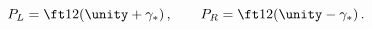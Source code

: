 \begin{equation}
  P_L=\ft12(\unity +\gamma _*)\,,\qquad P_R=\ft12(\unity -\gamma _*)\,.
 \label{PLPR}
\end{equation}

